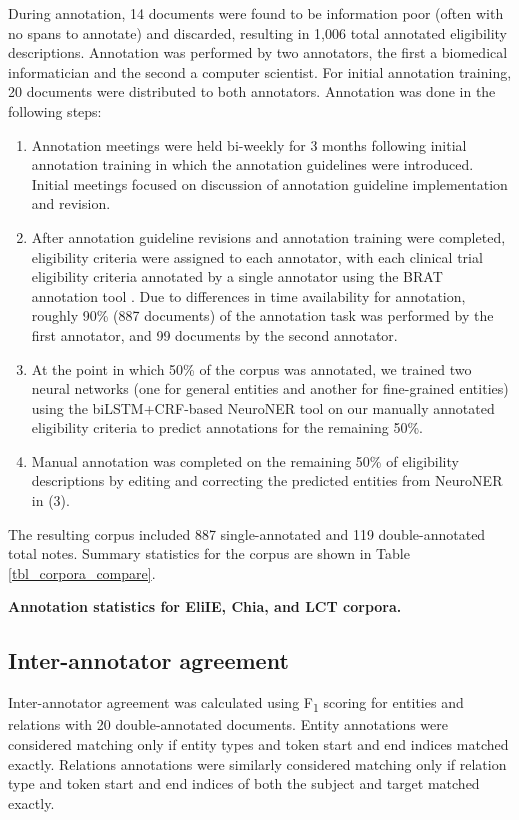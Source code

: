\documentclass[../main.tex]{subfiles}
\begin{document}
During annotation, 14 documents were found to be information poor (often with no spans to annotate) and discarded, resulting in 1,006 total annotated eligibility descriptions. Annotation was performed by two annotators, the first a biomedical informatician and the second a computer scientist. For initial annotation training, 20 documents were distributed to both annotators. Annotation was done in the following steps:

\begin{enumerate}
    \item Annotation meetings were held bi-weekly for 3 months following initial annotation training in which the annotation guidelines were introduced. Initial meetings focused on discussion of annotation guideline implementation and revision.
    \item After annotation guideline revisions and annotation training were completed, eligibility criteria were assigned to each annotator, with each clinical trial eligibility criteria annotated by a single annotator using the BRAT annotation tool \cite{stenetorp2012brat}. Due to differences in time availability for annotation, roughly 90\% (887 documents) of the annotation task was performed by the first annotator, and 99 documents by the second annotator.
    \item At the point in which 50\% of the corpus was annotated, we trained two neural networks (one for general entities and another for fine-grained entities) using the biLSTM+CRF-based NeuroNER tool \cite{dernoncourt2017neuroner} on our manually annotated eligibility criteria to predict annotations for the remaining 50\%.
    \item Manual annotation was completed on the remaining 50\% of eligibility descriptions by editing and correcting the predicted entities from NeuroNER in (3).

\end{enumerate}    
    
The resulting corpus included 887 single-annotated and 119 double-annotated total notes. Summary statistics for the corpus are shown in Table \ref{tbl_corpora_compare}.

\begin{table}[h!]
  \small
  \centering
  
  \caption{\textbf{Annotation statistics for EliIE, Chia, and LCT corpora.}}
  \label{tbl_corpora_compare}
\end{table}

\subsection{Inter-annotator agreement}
Inter-annotator agreement was calculated using F\textsubscript{1} scoring for entities and relations with 20 double-annotated documents. Entity annotations were considered matching only if entity types and token start and end indices matched exactly. Relations annotations were similarly considered matching only if relation type and token start and end indices of both the subject and target matched exactly.
\end{document}
